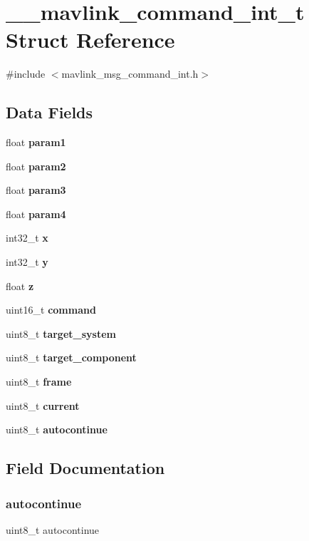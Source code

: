 \section{\+\_\+\+\_\+mavlink\+\_\+command\+\_\+int\+\_\+t Struct Reference}
\label{struct____mavlink__command__int__t}


{\ttfamily \#include $<$mavlink\+\_\+msg\+\_\+command\+\_\+int.\+h$>$}

\subsection*{Data Fields}
\begin{DoxyCompactItemize}
\item 
float \textbf{ param1}
\item 
float \textbf{ param2}
\item 
float \textbf{ param3}
\item 
float \textbf{ param4}
\item 
int32\+\_\+t \textbf{ x}
\item 
int32\+\_\+t \textbf{ y}
\item 
float \textbf{ z}
\item 
uint16\+\_\+t \textbf{ command}
\item 
uint8\+\_\+t \textbf{ target\+\_\+system}
\item 
uint8\+\_\+t \textbf{ target\+\_\+component}
\item 
uint8\+\_\+t \textbf{ frame}
\item 
uint8\+\_\+t \textbf{ current}
\item 
uint8\+\_\+t \textbf{ autocontinue}
\end{DoxyCompactItemize}


\subsection{Field Documentation}
\mbox{\label{struct____mavlink__command__int__t_a452a7419e65a96e39663cde437451882}} 
\subsubsection{autocontinue}
{\footnotesize\ttfamily uint8\+\_\+t autocontinue}

